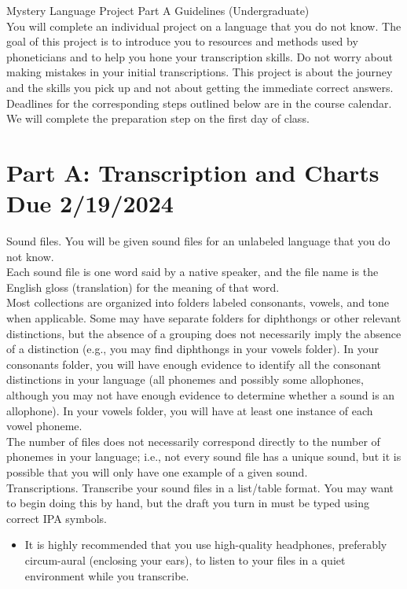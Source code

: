 \documentclass[12pt]{article}
\begin{document}
Mystery Language Project Part A Guidelines (Undergraduate)\\
You will complete an individual project on a language that you do not know. The goal of this project is to introduce you to resources and methods used by phoneticians and to help you hone your transcription skills. Do not worry about making mistakes in your initial transcriptions. This project is about the journey and the skills you pick up and not about getting the immediate correct answers.  Deadlines for the corresponding steps outlined below are in the course calendar.  We will complete the preparation step on the first day of class.\\
\section*{Part A:  Transcription and Charts Due 2/19/2024}
Sound files.  You will be given sound files for an unlabeled language that you do not know.\\
Each sound file is one word said by a native speaker, and the file name is the English gloss (translation) for the meaning of that word.\\
Most collections are organized into folders labeled consonants, vowels, and tone when applicable.  Some may have separate folders for diphthongs or other relevant distinctions, but the absence of a grouping does not necessarily imply the absence of a distinction (e.g., you may find diphthongs in your vowels folder).  In your consonants folder, you will have enough evidence to identify all the consonant distinctions in your language (all phonemes and possibly some allophones, although you may not have enough evidence to determine whether a sound is an allophone).  In your vowels folder, you will have at least one instance of each vowel phoneme.\\
The number of files does not necessarily correspond directly to the number of phonemes in your language; i.e., not every sound file has a unique sound, but it is possible that you will only have one example of a given sound.\\
Transcriptions.  Transcribe your sound files in a list/table format.  You may want to begin doing this by hand, but the draft you turn in must be typed using correct IPA symbols.\\
\begin{itemize}
\item It is highly recommended that you use high-quality headphones, preferably circum-aural (enclosing your ears), to listen to your files in a quiet environment while you transcribe.
\end{itemize}
\end{document}
